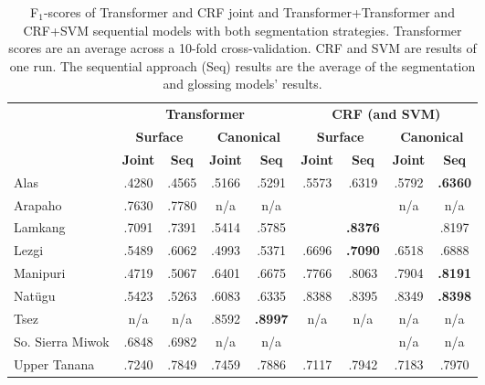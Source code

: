 \begin{table}[!tb]
    \centering
    \begin{tabular}{l|cc|cc|cc|cc}
          & \multicolumn{4}{c|}{\textbf{Transformer}} & \multicolumn{4}{c}{\textbf{CRF (and SVM)}} 
          \\
          & \multicolumn{2}{c|}{\textbf{Surface}} & \multicolumn{2}{c|}{\textbf{Canonical}}  & \multicolumn{2}{c|}{\textbf{Surface}} & \multicolumn{2}{c}{\textbf{Canonical}} 
          \\
          &  \textbf{Joint} & \textbf{Seq} &  \textbf{Joint} & \textbf{Seq} &  \textbf{Joint} & \textbf{Seq} &  \textbf{Joint} & \textbf{Seq} \\
         \hline
         Alas & .4280 & .4565 & .5166 & .5291 
              & .5573 & .6319 & .5792 & \textbf{.6360} \\
         \hline
         Arapaho & .7630 & .7780 & n/a & n/a 
                 &  &  & n/a & n/a  \\
         \hline
         Lamkang & .7091 & .7391 & .5414 & .5785 
         &  & \textbf{.8376} &  & .8197 \\
         \hline
         Lezgi  & .5489 & .6062 & .4993 & .5371 
                & .6696 & \textbf{.7090} & .6518 & .6888 \\
         \hline
         Manipuri & .4719 & .5067 & .6401 & .6675 
                  & .7766 & .8063 & .7904 & \textbf{.8191} \\
         \hline
         Natügu & .5423 & .5263 & .6083 & .6335 
                & .8388 & .8395 & .8349 & \textbf{.8398} \\
         \hline
         Tsez & n/a & n/a & .8592 & \textbf{.8997} 
              & n/a & n/a & n/a & n/a \\
         \hline
         So. Sierra Miwok & .6848 & .6982 & n/a & n/a 
                          &  &  & n/a & n/a \\
         \hline
         Upper Tanana & .7240 & .7849 & .7459 & .7886
                      & .7117 & .7942 & .7183 & .7970 \\
    \end{tabular}
    \caption[Results of All Segmentation and Glossing Models]{F$_1$-scores of Transformer and CRF joint and Transformer+Transformer and CRF+SVM sequential models with both segmentation strategies. Transformer scores are an average across a 10-fold cross-validation. CRF and SVM are results of one run. The sequential approach (Seq) results are the average of the segmentation and glossing models' results.}
    \label{tab:allsgresults}
\end{table}


